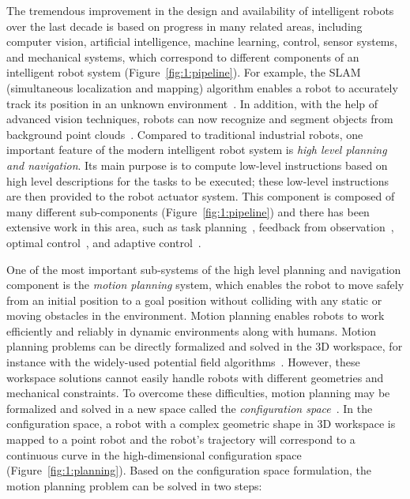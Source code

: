The tremendous improvement in the design and availability of intelligent robots over the last decade is based on progress in many related areas, including computer vision, artificial intelligence, machine learning, control, sensor systems, and mechanical systems, which correspond to different components of an intelligent robot system (Figure~\ref{fig:1:pipeline}). For example, the SLAM (simultaneous localization and mapping) algorithm enables a robot to accurately track its position in an unknown environment~\cite{PR:2005}. In addition, with the help of advanced vision techniques, robots can now recognize and segment objects from background point clouds~\cite{Rusu:2009:IROS}. 
Compared to traditional industrial robots, one important feature of the modern intelligent robot system is \emph{high level planning and navigation}. Its main purpose is to compute low-level instructions based on high level descriptions for the tasks to be executed; these low-level instructions are then provided to the robot actuator system.
This component is composed of many different sub-components (Figure~\ref{fig:1:pipeline}) and there has been extensive work in this area, such as task planning~\cite{LPT:TPP:1989}, feedback from observation~\cite{KLP:2012:UPE,KLP:2011:NOW}, optimal control~\cite{Stengel:1994:OC}, and adaptive control~\cite{Astrom:1994:AC}.


One of the most important sub-systems of the high level planning and navigation component is the \emph{motion planning} system, which enables the robot to move safely from an initial position to a goal position without colliding with any static or moving obstacles in the environment. Motion planning enables robots to work efficiently and reliably in dynamic environments along with humans. Motion planning problems can be directly formalized and solved in the 3D workspace, for instance with the widely-used potential field algorithms~\cite{Khatib:IJRR:1986}. However, these workspace solutions cannot easily handle robots with different geometries and mechanical constraints. To overcome these difficulties, 
motion planning may be formalized and solved in a new space called the \emph{configuration space}~\cite{Lozano-Perez:1979:APC,LPT:APM:1981,LPT:SpatialPlanning:1983}. In the configuration space, a robot with a complex geometric shape in 3D workspace is mapped to a point robot and the robot's trajectory will correspond to a continuous curve in the high-dimensional configuration space (Figure~\ref{fig:1:planning}). Based on the configuration space formulation, the motion planning problem can be solved in two steps:

